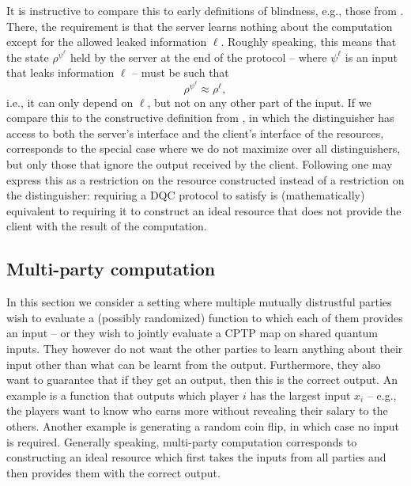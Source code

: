 It is instructive to compare this to early definitions of blindness,
e.g., those from \textcite{BFK09,FK17}. There, the requirement is that
the server learns nothing about the computation except for the allowed
leaked information $\ell$. Roughly speaking, this means that the state
$\rho^{\psi^\ell}$ held by the server at the end of the protocol \---
where $\psi^\ell$ is an input that leaks information $\ell$ \--- must
be such that \begin{equation}\label{eq:dqc.standalone}
  \rho^{\psi^\ell} \approx \rho^\ell,\end{equation} i.e., it can only
depend on $\ell$, but not on any other part of the input. If we
compare this to the constructive definition from \textcite{DFPR14}, in
which the distinguisher has access to both the server's interface and
the client's interface of the resources, 
corresponds to the special case where we do not maximize over all
distinguishers, but only those that ignore the output received by the
client. Following  one may express this as a
restriction on the resource constructed instead of a restriction on
the distinguisher: requiring a DQC protocol to satisfy
 is (mathematically) equivalent to requiring
it to construct an ideal resource that does not provide the client
with the result of the computation.

\subsection{Multi-party computation}
\label{sec:mpc}

In this section we consider a setting where multiple mutually
distrustful parties wish to evaluate a (possibly randomized) function
to which each of them provides an input \--- or they wish to jointly
evaluate a CPTP map on shared quantum inputs. They however do not want
the other parties to learn anything about their input other than
what can be learnt from the output. Furthermore, they also want to
guarantee that if they get an output, then this is the correct
output. An example is a function that outputs which player $i$ has the
largest input $x_i$ \--- e.g., the players want to know who earns more
without revealing their salary to the others. Another example is
generating a random coin flip, in which case no input is
required. Generally speaking, multi-party computation corresponds to constructing an ideal resource
which first takes the inputs from all parties and then provides them
with the correct output.

